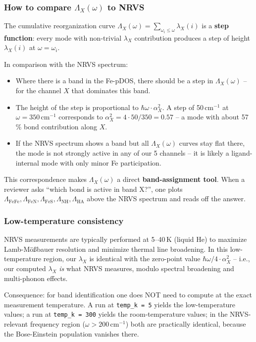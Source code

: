 \documentclass[11pt,a4paper,twoside]{article}
\theoremstyle{remark}
\begin{document}
\subsubsection*{How to compare $\Lambda_X(\omega)$ to NRVS}

The cumulative reorganization curve
$\Lambda_X(\omega) = \sum_{\omega_i \leq \omega} \lambda_X(i)$ is a
\textbf{step function}: every mode with non-trivial $\lambda_X$
contribution produces a step of height $\lambda_X(i)$ at
$\omega = \omega_i$.

In comparison with the NRVS spectrum:
\begin{itemize}\setlength{\itemsep}{0pt}
  \item Where there is a band in the Fe-pDOS, there should be a
        step in $\Lambda_X(\omega)$ -- for the channel $X$ that
        dominates this band.
  \item The height of the step is proportional to
        $\hbar\omega \cdot \alpha_X^2$. A step of 50\,cm$^{-1}$ at
        $\omega = 350$\,cm$^{-1}$ corresponds to
        $\alpha_X^2 = 4 \cdot 50/350 = 0.57$ -- a mode with about
        57\,\% bond contribution along $X$.
  \item If the NRVS spectrum shows a band but all
        $\Lambda_X(\omega)$ curves stay flat there, the mode is
        not strongly active in any of our 5 channels -- it is
        likely a ligand-internal mode with only minor Fe
        participation.
\end{itemize}

This correspondence makes $\Lambda_X(\omega)$ a direct
\textbf{band-assignment tool}. When a reviewer asks ``which bond
is active in band X?'', one plots
$\Lambda_\text{FeFe}, \Lambda_\text{FeN}, \Lambda_\text{FeS},
\Lambda_\text{NH}, \Lambda_\text{HA}$ above the NRVS spectrum and
reads off the answer.

\subsubsection*{Low-temperature consistency}

NRVS measurements are typically performed at 5--40\,K (liquid He)
to maximize Lamb-M\"o{\ss}bauer resolution and minimize thermal
line broadening. In this low-temperature region, our $\lambda_X$
is identical with the zero-point value
$\hbar\omega/4 \cdot \alpha_X^2$ -- i.e., our computed $\lambda_X$
\emph{is} what NRVS measures, modulo spectral broadening and
multi-phonon effects.

Consequence: for band identification one does NOT need to compute
at the exact measurement temperature. A run at \texttt{temp\_k = 5}
yields the low-temperature values; a run at \texttt{temp\_k = 300}
yields the room-temperature values; in the NRVS-relevant frequency
region ($\omega > 200$\,cm$^{-1}$) both are practically identical,
because the Bose-Einstein population vanishes there.
\end{document}
